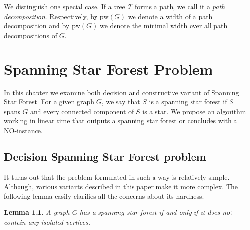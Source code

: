 \documentclass[en]{pracamgr}
\newtheorem{lemma}{Lemma}
\newcommand{\ssf}{spanning star forest}
\newcommand{\ssfp}{{\sc Spanning Star Forest}}
\begin{document}
We distinguish one special case. If a tree $\mathcal{T}$ forms a path, we call it a \emph{path decomposition}. Respectively, by $\textrm{pw}(G)$ we denote a width of a path decomposition and by $\textrm{pw}(G)$ we denote the minimal width over all path decompositions of $G$.

\chapter{Spanning Star Forest Problem}\label{r:losers}

In this chapter we examine both decision and constructive variant of \ssfp{}. For a given graph $G$, we say that $S$ is a \ssf{} if $S$ spans $G$ and every connected component of $S$ is a star. We propose an algorithm working in linear time that outputs a \ssf{} or concludes with a NO-instance.

\section{Decision Spanning Star Forest problem}

It turns out that the problem formulated in such a way is relatively simple. Although, various variants described in this paper make it more complex. The following lemma easily clarifies all the concerns about its hardness.

\begin{lemma}\label{SSF lemma}
 A graph $G$ has a \ssf{} if and only if it does not contain any isolated vertices.
\end{lemma}
\end{document}
